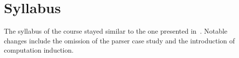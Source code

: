 \section{Syllabus}

The syllabus of the course stayed similar to the one presented in~\citep{next_1100}.
Notable changes include the omission of the parser case study
and the introduction of computation induction.

